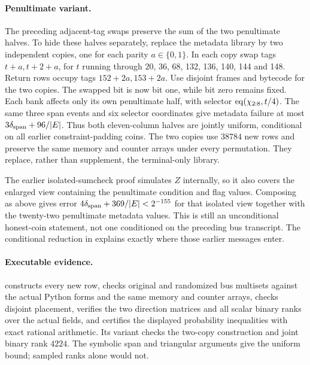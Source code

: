 \documentclass[11pt]{article}
\begin{document}
\paragraph{Penultimate variant.} The preceding adjacent-tag swaps preserve the sum of the two penultimate halves. To hide these halves separately, replace the metadata library by two independent copies, one for each parity $a\in\{0,1\}$. In each copy swap tags $t+a,t+2+a$, for $t$ running through 20, 36, 68, 132, 136, 140, 144 and 148. Return rows occupy tags $152+2a,153+2a$. Use disjoint frames and bytecode for the two copies. The swapped bit is now bit one, while bit zero remains fixed. Each bank affects only its own penultimate half, with selector $\operatorname{eq}(\chi_{2:8},t/4)$. The same three span events and six selector coordinates give metadata failure at most $3\delta_{\mathrm{span}}+96/|E|$. Thus both eleven-column halves are jointly uniform, conditional on all earlier constraint-padding coins. The two copies use $38784$ new rows and preserve the same memory and counter arrays under every permutation. They replace, rather than supplement, the terminal-only library.

The earlier isolated-sumcheck proof simulates $Z$ internally, so it also covers the enlarged view containing the penultimate condition and flag values. Composing as above gives error $4\delta_{\mathrm{span}}+369/|E|<2^{-155}$ for that isolated view together with the twenty-two penultimate metadata values. This is still an unconditional honest-coin statement, not one conditioned on the preceding bus transcript. The conditional reduction in  explains exactly where those earlier messages enter.

\paragraph{Executable evidence.}  constructs every new row, checks original and randomized bus multisets against the actual Python forms and the same memory and counter arrays, checks disjoint placement, verifies the two direction matrices and all scalar binary ranks over the actual fields, and certifies the displayed probability inequalities with exact rational arithmetic. Its  variant checks the two-copy construction and joint binary rank $4224$. The symbolic span and triangular arguments give the uniform bound; sampled ranks alone would not.
\end{document}
